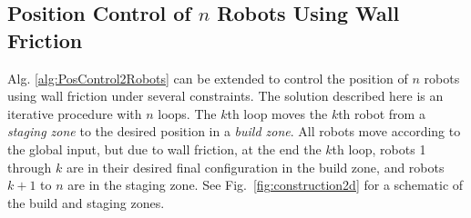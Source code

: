 





\subsection{Position Control of $n$ Robots Using Wall Friction}\label{sec:PostionControlnRobots}
Alg. \ref{alg:PosControl2Robots}  can be extended to control the position of $n$ robots using wall friction under several constraints. The solution described here is an iterative procedure with $n$ loops. The $k$th loop moves the $k$th robot from a \emph{staging zone} to the desired position in a \emph{build zone}. All robots move according to the global input, but due to wall friction, at the end the $k$th loop, robots 1 through $k$ are in their desired final configuration in the build zone, and robots $k+1$ to $n$ are in the staging zone. See Fig.~\ref{fig:construction2d} for a schematic of the build and staging zones.



